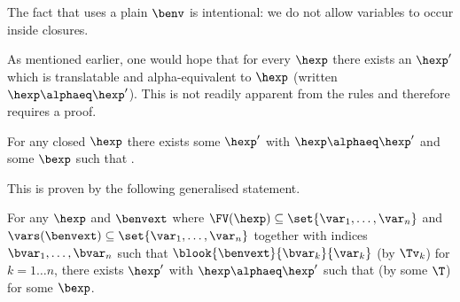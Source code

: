 The fact that  uses a plain $\benv$ is intentional: we do not allow \hlang variables to occur inside \blang closures.

As mentioned earlier, one would hope that for every $\hexp$ there exists an $\hexp'$ which is translatable and alpha-equivalent to $\hexp$ (written $\hexp \alphaeq \hexp'$).
This is not readily apparent from the rules and therefore requires a proof.

\begin{theorem}[Totality]
For any closed $\hexp$ there exists some $\hexp'$ with $\hexp \alphaeq \hexp'$ and some $\bexp$ such that .
\end{theorem}

This is proven by the following generalised statement.

\begin{lemma}
For any $\hexp$ and $\benvext$ where $\FV(\hexp) \subseteq \set{\var_1, \ldots, \var_n}$ and $\vars(\benvext) \subseteq \set{\var_1, \ldots, \var_n}$ together with indices $\bvar_1, \ldots, \bvar_n$ such that $\blook{\benvext}{\bvar_k}{\var_k}$ (by $\Tv_k$) for $k = 1 \ldots n$, there exists $\hexp'$ with $\hexp \alphaeq \hexp'$ such that  (by some $\T$) for some $\bexp$.
\end{lemma}

